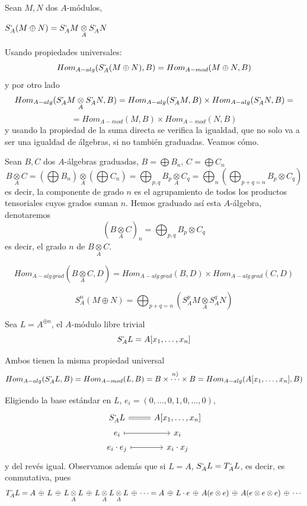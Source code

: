 Sean $M, N$ dos $A$-m\'odulos, 
\begin{propi}
    $S^{\boldsymbol{\cdot}}_A(M \oplus N) =S^{\boldsymbol{\cdot}}_AM \underset{A}{\otimes} S^{\boldsymbol{\cdot}}_A N$
\end{propi} 
\begin{dem}
    Usando propiedades universales:
    $$Hom_{A-alg}(S^{\boldsymbol{\cdot}}_A(M \oplus N), B) = Hom_{A-mod}(M\oplus N, B) $$
    y por otro lado
    $$Hom_{A-alg} (S^{\boldsymbol{\cdot}}_AM \underset{A}{\otimes} S^{\boldsymbol{\cdot}}_A N, B) = Hom_{A-alg}(S^{\boldsymbol{\cdot}}_AM, B) \times Hom_{A-alg}(S^{\boldsymbol{\cdot}}_AN, B) = $$
    $$ = Hom_{A-mod}(M, B) \times Hom_{A-mod}(N, B) $$
    y usando la propiedad de la suma directa se verifica la igualdad, que no solo va a ser una igualdad de \'algebras, si no tambi\'en graduadas. Veamos c\'omo. 
    
    Sean $B, C$ dos $A$-\'algebras graduadas, $B = \bigoplus B_n, \, C=\bigoplus C_n$
    $$B \underset{A}{\otimes} C = (\bigoplus B_n) \underset{A}{\otimes} (\bigoplus C_n) = \bigoplus_{p,q} B_p \underset{A}{\otimes} C_q = \bigoplus_n \left(\bigoplus_{p+q=n} B_p \otimes C_q \right) $$
    es decir, la componente de grado $n$ es el agrupamiento de todos los productos tensoriales cuyos grados suman $n$. Hemos graduado as\'i esta $A$-\'algebra, denotaremos $$(B \underset{A}{\otimes} C)_n = \bigoplus_{p,q} B_p \otimes C_q$$
    es decir, el grado $n$ de $B \underset{A}{\otimes} C$. 
\end{dem}
\begin{propi}
    $$Hom_{A-alg \, grad}(B \underset{A}{\otimes} C, D) = Hom_{A-alg \, grad} (B,D)\times Hom_{A-alg \, grad} (C,D)$$
\end{propi}
\begin{cor}
    $$S^{n}_A(M\oplus N) = \bigoplus_{p+q=n} (S^{p}_AM \underset{A}{\otimes} S^{q}_AN)$$
\end{cor}
\begin{prop}
    Sea $L = A^{\oplus n}$, el $A$-m\'odulo libre trivial
    $$S^{\boldsymbol{\cdot}}_A L = A[x_1, \ldots, x_n]$$
\end{prop}
\begin{dem}
    Ambos tienen la misma propiedad universal 
    $$Hom_{A-alg}(S^{\boldsymbol{\cdot}}_AL, B) = Hom_{A-mod}(L, B) = B \times \overset{n)}{\cdots} \times B = Hom_{A-alg}(A[x_1, \ldots, x_n], B)$$
\end{dem}
\begin{obs}
    Eligiendo la base est\'andar en $L$, $e_i = (0,\ldots, 0, 1, 0,  \ldots, 0)$, 
    $$\bt S^{\bdot}_A L \arrow[equal]{r} & A[x_1, \ldots, x_n] \\[-5mm] e_i \arrow[mapsto]{r} & x_i \\[-5mm] e_i \cdot e_j\arrow[mapsto]{r} & x_i \cdot x_j \et$$
    y del rev\'es igual. Observamos adem\'as que si $L=A$, $S^{\boldsymbol{\cdot}}_AL = T^{\boldsymbol{\cdot}}_A L$, es decir, es conmutativa, pues 
    $$ T^{\boldsymbol{\cdot}}_A L = A \, \oplus \, L \, \oplus \,  L\underset{A}{\otimes} L \, \oplus \, L\underset{A}{\otimes} L \underset{A}{\otimes} L \, \oplus \,  \cdots = A \, \oplus \, L\cdot e \, \oplus\,  A(e\otimes e) \, \oplus \, A(e\otimes e\otimes e) \, \oplus\,  \cdots $$
    \end{obs}
